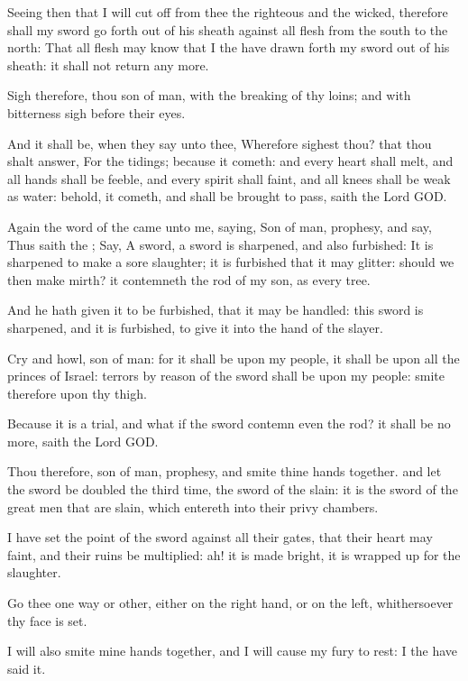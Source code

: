 \verse Seeing then that I will cut off from thee the righteous and the wicked, therefore shall my sword go forth out of his sheath against all flesh from the south to the north: \verse That all flesh may know that I the \LORD have drawn forth my sword out of his sheath: it shall not return any more.

\verse Sigh therefore, thou son of man, with the breaking of thy loins; and with bitterness sigh before their eyes.

\verse And it shall be, when they say unto thee, Wherefore sighest thou?  that thou shalt answer, For the tidings; because it cometh: and every heart shall melt, and all hands shall be feeble, and every spirit shall faint, and all knees shall be weak as water: behold, it cometh, and shall be brought to pass, saith the Lord GOD.

\verse Again the word of the \LORD came unto me, saying, \verse Son of man, prophesy, and say, Thus saith the \LORD; Say, A sword, a sword is sharpened, and also furbished: \verse It is sharpened to make a sore slaughter; it is furbished that it may glitter: should we then make mirth? it contemneth the rod of my son, as every tree.

\verse And he hath given it to be furbished, that it may be handled: this sword is sharpened, and it is furbished, to give it into the hand of the slayer.

\verse Cry and howl, son of man: for it shall be upon my people, it shall be upon all the princes of Israel: terrors by reason of the sword shall be upon my people: smite therefore upon thy thigh.

\verse Because it is a trial, and what if the sword contemn even the rod?  it shall be no more, saith the Lord GOD.

\verse Thou therefore, son of man, prophesy, and smite thine hands together. and let the sword be doubled the third time, the sword of the slain: it is the sword of the great men that are slain, which entereth into their privy chambers.

\verse I have set the point of the sword against all their gates, that their heart may faint, and their ruins be multiplied: ah! it is made bright, it is wrapped up for the slaughter.

\verse Go thee one way or other, either on the right hand, or on the left, whithersoever thy face is set.

\verse I will also smite mine hands together, and I will cause my fury to rest: I the \LORD have said it.

